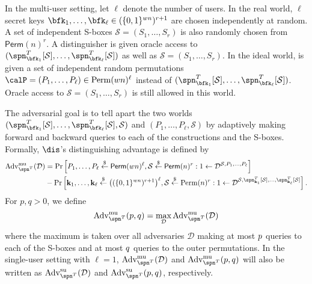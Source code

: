 In the multi-user setting, let $\ell$ denote the number of users. In the real
world, $\ell$ secret keys $\bfk_1,\ldots,\bfk_\ell\in(\{0,1\}^{wn})^{r+1}$ are chosen independently at random.
A set of independent S-boxes $\mathcal{S}=(S_1,\ldots,S_r)$ is also randomly chosen from $\textsf{Perm}(n)^r$. A distinguisher \dis is given oracle access to $(\spn_{\bfk_1}^T[\mathcal{S}],\ldots,\spn_{\bfk_\ell}^T[\mathcal{S}])$ as
well as $\mathcal{S}=(S_1,\ldots,S_r)$. In the ideal world, \dis is given a set of independent
random permutations ${\calP}=({P}_1,\ldots,{P}_{\ell})\in{\operatorname{Perm}}(wn)^\ell$ instead of $(\spn_{\bfk_1}^T[\mathcal{S}],\ldots,\spn_{\bfk_\ell}^T[\mathcal{S}])$. Oracle access to $\mathcal{S}=(S_1,\ldots,S_r)$ is still allowed in this world.


The adversarial goal is to tell apart the two worlds $(\spn_{\bfk_1}^T[\mathcal{S}],\ldots,\spn_{\bfk_\ell}^T[\mathcal{S}],\mathcal{S})$ and $({P}_1,\ldots,{P}_{\ell},\mathcal{S})$ by adaptively making forward and backward queries to each
of the constructions and the S-boxes. Formally, $\dis$'s distinguishing advantage is
defined by
%
$$
\begin{aligned}
\operatorname{Adv}_{\spn^T}^{\mathrm{mu}}(\mathcal{D}) &=\operatorname{Pr}\left[{P}_1,\ldots,{P}_{\ell} \stackrel{\$}{\leftarrow} {\mathsf{Perm}}(w n)^\ell, \mathcal{S} \stackrel{\$}{\leftarrow} \mathsf{Perm}(n)^{r}: 1 \leftarrow \mathcal{D}^{\mathcal{S}, {P}_{1}, \ldots, {P}_{\ell}}\right] \\
&-\operatorname{Pr}\left[\mathbf{k}_{1}, \ldots, \mathbf{k}_{\ell} \stackrel{\$}{\leftarrow} \big((\{0,1\}^{wn})^{r+1}\big)^{\ell}, \mathcal{S} \stackrel{\$}{\leftarrow} \operatorname{Perm}(n)^{r}: 1 \leftarrow \mathcal{D}^{\mathcal{S}, \spn_{\mathbf{k}_{1}}^T[\mathcal{S}], \ldots, \spn_{\mathbf{k}_{\ell}}^T[\mathcal{S}]}\right].
\end{aligned}
$$
%
For $p,q > 0$, we define
%
$$
\operatorname{Adv}^{\mathrm{mu}}_{\spn^T}(p, q) = \max _{\mathcal{D}} \operatorname{Adv}^{\mathrm{mu}}_{\spn^T}(\mathcal{D})
$$
%
where the maximum is taken over all adversaries $\mathcal{D}$ making at most $\mathnormal{p}$ queries to each of the S-boxes and at most $\mathnormal{q}$ queries to the outer permutations. In the single-user setting with $\ell = 1$, $\operatorname{Adv}^{\mathrm{mu}}_{\spn^T}(\mathcal{D})$ and $\operatorname{Adv}^{\mathrm{mu}}_{\spn^T}(p, q)$  will also be written as $\operatorname{Adv}^{\mathrm{su}}_{\spn^T}(\mathcal{D})$ and $\operatorname{Adv}^{\mathrm{su}}_{\spn^T}(p, q)$, respectively.





